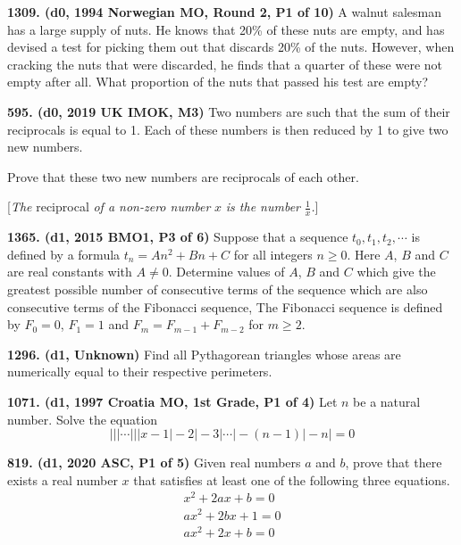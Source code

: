 \documentclass{article}
\begin{document}
\textbf{1309. (\color{red}d0\color{black}, 1994 Norwegian MO, Round 2, P1 of 10)} A walnut salesman has a large supply of nuts. He knows that 20\% of these nuts are empty, and has devised a test for picking them out that discards 20\% of the nuts. However, when cracking the nuts that were discarded, he finds that a quarter of these were not empty after all. What proportion of the nuts that passed his test are empty?

\textbf{595. (\color{red}d0\color{black}, 2019 UK IMOK, M3)} Two numbers are such that the sum of their reciprocals is equal to 1. Each of these numbers is then reduced by 1 to give two new numbers.

Prove that these two new numbers are reciprocals of each other.

\begin{center}
    [\emph{The }reciprocal\emph{ of a non-zero number} $x$ \emph{is the number }$\frac1x$\emph{.}]
\end{center}

\textbf{1365. (\color{red}d1\color{black}, 2015 BMO1, P3 of 6)} Suppose that a sequence $t_0, t_1, t_2, \cdots$ is defined by a formula $t_n = An^2 + Bn + C$ for all integers $n \ge 0$. Here $A$, $B$ and $C$ are real constants with $A \ne 0$. Determine values of $A$, $B$ and $C$ which give the greatest possible number of consecutive terms of the sequence which are also consecutive terms of the Fibonacci sequence, The Fibonacci sequence is defined by $F_0 = 0$, $F_1 = 1$ and $F_m = F_{m-1} + F_{m-2}$ for $m \ge 2$.

\textbf{1296. (\color{red}d1\color{black}, Unknown)} Find all Pythagorean triangles whose areas are numerically equal to their respective perimeters.

\textbf{1071. (\color{red}d1\color{black}, 1997 Croatia MO, 1st Grade, P1 of 4)} Let $n$ be a natural number. Solve the equation \begin{equation*}\lvert\lvert\lvert\cdots\lvert\lvert\lvert x-1\rvert -2\rvert-3\rvert \cdots\rvert - (n-1)\rvert - n\rvert = 0\end{equation*}

\textbf{819. (\color{red}d1\color{black}, 2020 ASC, P1 of 5)} Given real numbers $a$ and $b$, prove that there exists a real number $x$ that satisfies at least one of the following three equations. $$ \begin{array}{r} x^{2}+2 a x+b=0 \\ a x^{2}+2 b x+1=0 \\ a x^{2}+2 x+b=0 \end{array} $$
\end{document}
